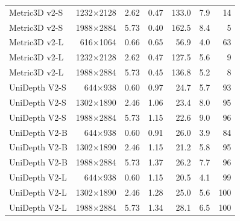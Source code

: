 \begin{tabular}{@{}lrrrrrr@{}}
Metric3D v2-S & 1232$\times$2128 & 2.62 & 0.47 & 133.0 & 7.9 & 14 \\
Metric3D v2-S & 1988$\times$2884 & 5.73 & 0.40 & 162.5 & 8.4 & 5 \\
\addlinespace
Metric3D v2-L & 616$\times$1064 & 0.66 & 0.65 & 56.9 & 4.0 & 63 \\
Metric3D v2-L & 1232$\times$2128 & 2.62 & 0.47 & 127.5 & 5.6 & 9 \\
Metric3D v2-L & 1988$\times$2884 & 5.73 & 0.45 & 136.8 & 5.2 & 8 \\
\addlinespace
UniDepth V2-S & 644$\times$938 & 0.60 & 0.97 & 24.7 & 5.7 & 93 \\
UniDepth V2-S & 1302$\times$1890 & 2.46 & 1.06 & 23.4 & 8.0 & 95 \\
UniDepth V2-S & 1988$\times$2884 & 5.73 & 1.15 & 22.6 & 9.0 & 96 \\
\addlinespace
UniDepth V2-B & 644$\times$938 & 0.60 & 0.91 & 26.0 & 3.9 & 84 \\
UniDepth V2-B & 1302$\times$1890 & 2.46 & 1.15 & 21.2 & 5.8 & 95 \\
UniDepth V2-B & 1988$\times$2884 & 5.73 & 1.37 & 26.2 & 7.7 & 96 \\
\addlinespace
UniDepth V2-L & 644$\times$938 & 0.60 & 1.15 & 20.5 & 4.1 & 99 \\
UniDepth V2-L & 1302$\times$1890 & 2.46 & 1.28 & 25.0 & 5.6 & 100 \\
UniDepth V2-L & 1988$\times$2884 & 5.73 & 1.34 & 28.1 & 6.5 & 100 \\
\bottomrule
\end{tabular}
